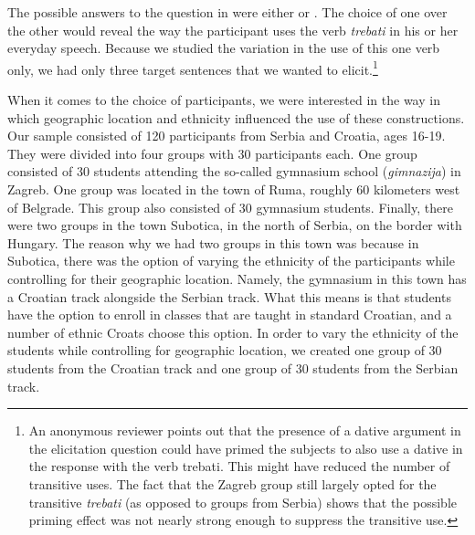 \documentclass[output=paper,modfonts,newtxmath,hidelinks,]{langscibook}
\begin{document}
\ea \label{7:ex7}
	\z
\z

\noindent The possible answers to the question in  were either  or . The choice of one over the other would reveal the way the participant uses the verb \textit{trebati} in his or her everyday speech. Because we studied the variation in the use of this one verb only, we had only three target sentences that we wanted to elicit.\footnote{\label{7:fn2}An anonymous reviewer points out that the presence of a dative argument in the elicitation question could have primed the subjects to also use a dative in the response with the verb trebati. This might have reduced the number of transitive uses. The fact that the Zagreb group still largely opted for the transitive \textit{trebati} (as opposed to groups from Serbia) shows that the possible priming effect was not nearly strong enough to suppress the transitive use.}

When it comes to the choice of participants, we were interested in the way in which geographic location and ethnicity influenced the use of these constructions. Our sample consisted of 120 participants from Serbia and Croatia, ages 16-19. They were divided into four groups with 30 participants each. One group consisted of 30 students attending the so-called gymnasium school (\textit{gimnazija}) in Zagreb. One group was located in the town of Ruma, roughly 60 kilometers west of Belgrade. This group also consisted of 30 gymnasium students. Finally, there were two groups in the town Subotica, in the north of Serbia, on the border with Hungary. The reason why we had two groups in this town was because in Subotica, there was the option of varying the ethnicity of the participants while controlling for their geographic location. Namely, the gymnasium in this town has a Croatian track alongside the Serbian track. What this means is that students have the option to enroll in classes that are taught in standard Croatian, and a number of ethnic Croats choose this option. In order to vary the ethnicity of the students while controlling for geographic location, we created one group of 30 students from the Croatian track and one group of 30 students from the Serbian track. 
\end{document}
